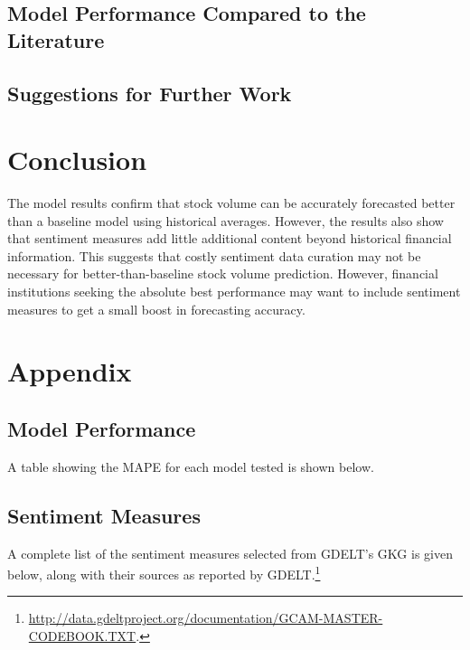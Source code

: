 \documentclass[12pt]{article}
\begin{document}
\subsection{Model Performance Compared to the Literature}
\subsection{Suggestions for Further Work}

\section{Conclusion}
The model results confirm that stock volume can be accurately forecasted better than a baseline model using historical averages. However, the results also show that sentiment measures add little additional content beyond historical financial information. This suggests that costly sentiment data curation may not be necessary for better-than-baseline stock volume prediction. However, financial institutions seeking the absolute best performance may want to include sentiment measures to get a small boost in forecasting accuracy.

\newpage
\printbibliography

\section{Appendix}
\subsection{Model Performance}
A table showing the MAPE for each model tested is shown below.


\subsection{Sentiment Measures}
A complete list of the sentiment measures selected from GDELT's GKG is given below, along with their sources as reported by GDELT.\footnote{\url{http://data.gdeltproject.org/documentation/GCAM-MASTER-CODEBOOK.TXT}.}
\end{document}
